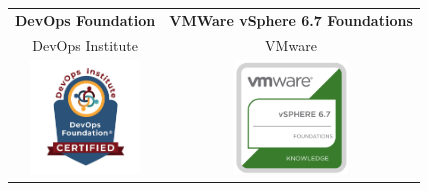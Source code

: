 \documentclass[9pt]{developercv} %
\begin{document}


\setlength{\tabcolsep}{12pt}
\begin{tabular}{cc}
  \textbf{DevOps Foundation} & \textbf{VMWare vSphere 6.7 Foundations} \\
  DevOps Institute & VMware \\
  \includegraphics[height=3cm]{img/cert_devops.jpg} & \includegraphics[height=3cm]{img/cert_vmware-foundations.png}
\end{tabular}\\

\end{document}
